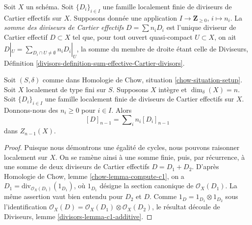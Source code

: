 \begin{definition}
\label{definition-locally-finite-sum-effective-Cartier-divisors}
Soit $X$ un schéma.
Soit $\{D_i\}_{i \in I}$ une famille localement finie
de diviseurs de Cartier effectifs sur $X$.
Supposons donnée une application
$I \to \mathbf{Z}_{\geq 0}$, $i \mapsto n_i$.
La {\it somme des diviseurs de Cartier effectifs}
$D = \sum n_i D_i$ est l'unique diviseur de Cartier effectif
$D \subset X$ tel que, pour tout ouvert quasi-compact $U \subset X$,
on ait $D|_U = \sum_{D_i \cap U \not = \emptyset} n_iD_i|_U$,
la somme du membre de droite étant celle de Diviseurs,
Définition \ref{divisors-definition-sum-effective-Cartier-divisors}.
\end{definition}

\begin{lemma}
\label{lemma-sum-divisors-associated-Weil}
Soit $(S, \delta)$ comme dans Homologie de Chow, situation \ref{chow-situation-setup}.
Soit $X$ localement de type fini sur $S$.
Supposons $X$ intègre et $\dim_\delta(X) = n$.
Soit $\{D_i\}_{i \in I}$ une famille localement finie
de diviseurs de Cartier effectifs sur $X$.
Donnons-nous des $n_i \geq 0$ pour $i \in I$.
Alors
$$
[D]_{n - 1} = \sum\nolimits_i n_i[D_i]_{n - 1}
$$
dans $Z_{n - 1}(X)$.
\end{lemma}

\begin{proof}
Puisque nous démontrons une égalité de cycles, nous pouvons raisonner localement sur $X$.
On se ramène ainsi à une somme finie, puis, par récurrence, à une somme de
deux diviseurs de Cartier effectifs $D = D_1 + D_2$.
D'après Homologie de Chow, lemme \ref{chow-lemma-compute-c1}, on a
$D_1 = \text{div}_{\mathcal{O}_X(D_1)}(1_{D_1})$, où
$1_{D_1}$ désigne la section canonique de $\mathcal{O}_X(D_1)$.
La même assertion vaut bien entendu pour $D_2$ et $D$.
Comme $1_D = 1_{D_1} \otimes 1_{D_2}$ sous l'identification
$\mathcal{O}_X(D) = \mathcal{O}_X(D_1) \otimes \mathcal{O}_X(D_2)$,
le résultat découle de Diviseurs, lemme \ref{divisors-lemma-c1-additive}.
\end{proof}

